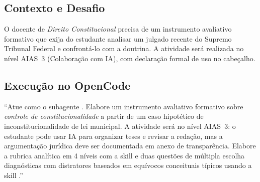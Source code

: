 \subsection{Contexto e Desafio}
O docente de \emph{Direito Constitucional} precisa de um instrumento avaliativo formativo que exija do estudante analisar um julgado recente do Supremo Tribunal Federal e confront{\'a}-lo com a doutrina. A atividade ser{\'a} realizada no n{\'i}vel AIAS~3 (Colabora{\c c}{\~a}o com IA), com declara{\c c}{\~a}o formal de uso no cabe{\c c}alho.

\subsection{Execu{\c c}{\~a}o no OpenCode}
\begin{tcolorbox}[colback=white, colframe=boxborder, arc=1mm, title={Comando Enviado pelo Professor}]
\small
``Atue como o subagente . Elabore um instrumento avaliativo formativo sobre \emph{controle de constitucionalidade} a partir de um caso hipot{\'e}tico de inconstitucionalidade de lei municipal. A atividade ser{\'a} no n{\'i}vel AIAS~3: o estudante pode usar IA para organizar teses e revisar a reda{\c c}{\~a}o, mas a argumenta{\c c}{\~a}o jur{\'i}dica deve ser documentada em anexo de transpar{\^e}ncia. Elabore a rubrica anal{\'i}tica em 4 n{\'i}veis com a skill  e duas quest{\~o}es de m{\'u}ltipla escolha diagn{\'o}sticas com distratores baseados em equ{\'i}vocos conceituais t{\'i}picos usando a skill .''
\end{tcolorbox}

